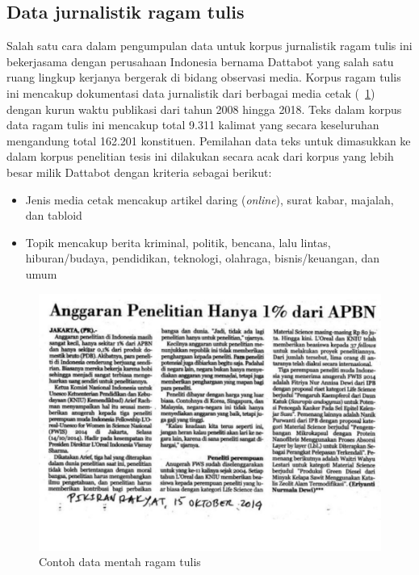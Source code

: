 \subsection{Data jurnalistik ragam tulis}
Salah satu cara dalam pengumpulan data untuk korpus jurnalistik ragam tulis ini bekerjasama dengan perusahaan Indonesia bernama Dattabot yang salah satu ruang lingkup kerjanya bergerak di bidang observasi media. Korpus ragam tulis ini mencakup dokumentasi data jurnalistik dari berbagai media cetak (\pic~\ref{fig:contoh-tulis-mentah}) dengan kurun waktu publikasi dari tahun 2008 hingga 2018. Teks dalam korpus data ragam tulis ini mencakup total 9.311 kalimat yang secara keseluruhan mengandung total 162.201 konstituen. Pemilahan data teks untuk dimasukkan ke dalam korpus penelitian tesis ini dilakukan secara acak dari korpus yang lebih besar milik Dattabot dengan kriteria sebagai berikut:

\begin{itemize}
	\item Jenis media cetak mencakup artikel daring (\textit{online}), surat kabar, majalah, dan tabloid
	\item Topik mencakup berita kriminal, politik, bencana, lalu lintas, hiburan/budaya, pendidikan, teknologi, olahraga, bisnis/keuangan, dan umum
\end{itemize}

\begin{figure}
	\centering \includegraphics[width=1
	\textwidth] {pics/contoh-tulis-mentah.png} \caption{Contoh data mentah ragam tulis} 
\label{fig:contoh-tulis-mentah} 
\end{figure}


